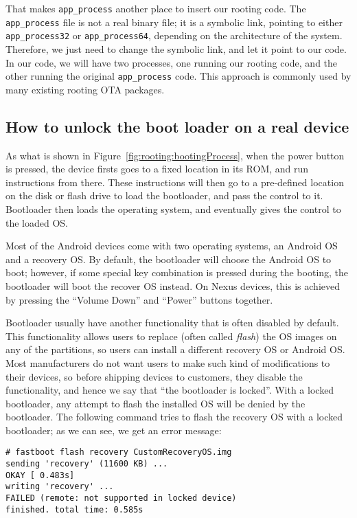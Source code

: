 That makes \texttt{app\_process} another place to insert our rooting code. 
The \texttt{app\_process} file is not a real binary file; it is a symbolic link, pointing to
either \texttt{app\_process32} or \texttt{app\_process64}, depending on the architecture of the system. 
Therefore, we just need to change the symbolic link, and let it point to our code. 
In our code, we will have two processes, one running our rooting code, and the other running 
the original \texttt{app\_process} code.  
This approach is commonly used by many existing rooting OTA packages. 



\subsection{How to unlock the boot loader on a real device}

As what is shown in Figure~\ref{fig:rooting:bootingProcess}, when the power
button is pressed, the device firsts goes to a fixed location in its ROM, and run
instructions from there. These instructions will then 
go to a pre-defined location on the disk or flash drive to 
load the bootloader, and pass the control to it. 
Bootloader then loads the operating system, and eventually gives the control
to the loaded OS.


Most of the Android devices come with two operating systems, an Android OS
and a recovery OS. By default, the bootloader will choose the Android OS to 
boot; however, if some special key combination is pressed during the
booting, the bootloader will boot the recover OS instead. On Nexus devices,
this is achieved by pressing the ``Volume Down'' and ``Power'' buttons together.


Bootloader usually have another functionality that is often disabled by
default. This functionality allows users to replace (often called
\textit{flash}) the OS images on any of
the partitions, so users can install a different recovery OS or Android OS. 
Most manufacturers do not want users to make such kind of modifications to
their devices, so before shipping devices to customers, they 
disable the functionality, and hence we say
that ``the bootloader is locked''.  With a locked bootloader, any attempt
to flash the installed OS will be denied by the bootloader. 
The following command tries to flash the recovery OS with a locked
bootloader; as we can see, we get an error message:

\begin{lstlisting}[frame=single, caption={}, label=label]
# fastboot flash recovery CustomRecoveryOS.img
sending 'recovery' (11600 KB) ...
OKAY [ 0.483s]
writing 'recovery' ...
FAILED (remote: not supported in locked device)
finished. total time: 0.585s
\end{lstlisting}


